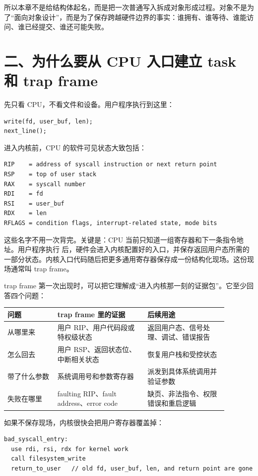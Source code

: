 所以本章不是给结构体起名，而是把一次普通写入拆成对象形成过程。对象不是为了“面向对象设计”，而是为了保存跨越硬件边界的事实：谁拥有、谁等待、谁能访问、谁已经提交、谁还可能失败。

\section{二、为什么要从 CPU 入口建立 task 和 trap frame}

先只看 CPU，不看文件和设备。用户程序执行到这里：

\begin{lstlisting}
write(fd, user_buf, len);
next_line();
\end{lstlisting}

进入内核前，CPU 的软件可见状态大致包括：

\begin{lstlisting}
RIP    = address of syscall instruction or next return point
RSP    = top of user stack
RAX    = syscall number
RDI    = fd
RSI    = user_buf
RDX    = len
RFLAGS = condition flags, interrupt-related state, mode bits
\end{lstlisting}

这些名字不用一次背完。关键是：CPU 当前只知道一组寄存器和下一条指令地址。用户程序执行  后，硬件会进入内核配置好的入口，并保存返回用户态所需的一部分状态。内核入口代码随后把更多通用寄存器保存成一份结构化现场。这份现场通常叫 trap frame。

trap frame 第一次出现时，可以把它理解成“进入内核那一刻的证据包”。它至少回答四个问题：

\begin{longtable}{p{0.2\linewidth}p{0.36\linewidth}p{0.32\linewidth}}
\toprule
问题 & trap frame 里的证据 & 后续用途 \\
\midrule
从哪里来 & 用户 RIP、用户代码段或特权级状态 & 返回用户态、信号处理、调试、错误报告 \\
怎么回去 & 用户 RSP、返回状态位、中断相关状态 & 恢复用户栈和受控状态 \\
带了什么参数 & 系统调用号和参数寄存器 & 派发到具体系统调用并验证参数 \\
失败在哪里 & faulting RIP、fault address、error code & 缺页、非法指令、权限错误和重启逻辑 \\
\bottomrule
\end{longtable}

如果不保存现场，内核很快会把用户寄存器覆盖掉：

\begin{lstlisting}
bad_syscall_entry:
  use rdi, rsi, rdx for kernel work
  call filesystem_write
  return_to_user   // old fd, user_buf, len, and return point are gone
\end{lstlisting}

